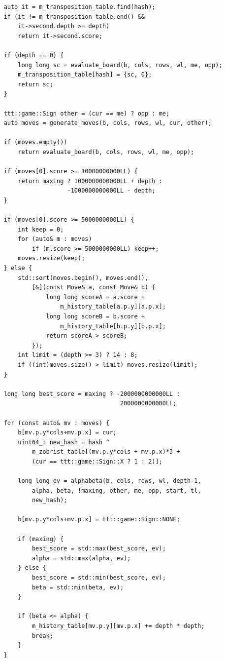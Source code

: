 \documentclass[a4paper,14pt]{extreport}
\begin{document}
\begin{lstlisting}
    auto it = m_transposition_table.find(hash);
    if (it != m_transposition_table.end() && 
        it->second.depth >= depth) 
        return it->second.score;
    
    if (depth == 0) {
        long long sc = evaluate_board(b, cols, rows, wl, me, opp);
        m_transposition_table[hash] = {sc, 0}; 
        return sc;
    }
    
    ttt::game::Sign other = (cur == me) ? opp : me;
    auto moves = generate_moves(b, cols, rows, wl, cur, other);
    
    if (moves.empty()) 
        return evaluate_board(b, cols, rows, wl, me, opp);
    
    if (moves[0].score >= 10000000000LL) {
        return maxing ? 1000000000000LL + depth : 
                      -1000000000000LL - depth;
    }
    
    if (moves[0].score >= 5000000000LL) {
        int keep = 0;
        for (auto& m : moves) 
            if (m.score >= 5000000000LL) keep++;
        moves.resize(keep);
    } else {
        std::sort(moves.begin(), moves.end(), 
            [&](const Move& a, const Move& b) {
                long long scoreA = a.score + 
                    m_history_table[a.p.y][a.p.x];
                long long scoreB = b.score + 
                    m_history_table[b.p.y][b.p.x];
                return scoreA > scoreB;
            });
        int limit = (depth >= 3) ? 14 : 8; 
        if ((int)moves.size() > limit) moves.resize(limit);
    }
    
    long long best_score = maxing ? -2000000000000LL : 
                                     2000000000000LL;
    
    for (const auto& mv : moves) {
        b[mv.p.y*cols+mv.p.x] = cur;
        uint64_t new_hash = hash ^ 
            m_zobrist_table[(mv.p.y*cols + mv.p.x)*3 + 
            (cur == ttt::game::Sign::X ? 1 : 2)];
        
        long long ev = alphabeta(b, cols, rows, wl, depth-1, 
            alpha, beta, !maxing, other, me, opp, start, tl, 
            new_hash);
        
        b[mv.p.y*cols+mv.p.x] = ttt::game::Sign::NONE;
        
        if (maxing) { 
            best_score = std::max(best_score, ev); 
            alpha = std::max(alpha, ev); 
        } else { 
            best_score = std::min(best_score, ev); 
            beta = std::min(beta, ev); 
        }
        
        if (beta <= alpha) { 
            m_history_table[mv.p.y][mv.p.x] += depth * depth; 
            break; 
        }
    }
    

\end{lstlisting}
\end{document}
